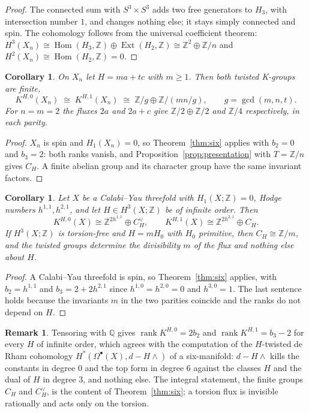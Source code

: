 \documentclass[reqno,11pt]{amsart}
\newtheorem{corollary}[theorem]{Corollary}
\theoremstyle{definition}
\newtheorem{remark}[theorem]{Remark}
\newcommand{\ZZ}{\mathbb{Z}}
\newcommand{\QQ}{\mathbb{Q}}
\newcommand{\rk}{\operatorname{rank}}
\DeclareMathOperator{\Hom}{Hom}
\DeclareMathOperator{\Ext}{Ext}
\begin{document}
\begin{proof}
The connected sum with $S^3\times S^3$ adds two free generators to $H_3$, with intersection number $1$, and changes nothing else; it stays simply connected and spin. The cohomology follows from the universal coefficient theorem: $H^3(X_n)\cong\Hom(H_3,\ZZ)\oplus\Ext(H_2,\ZZ)\cong\ZZ^2\oplus\ZZ/n$ and $H^2(X_n)\cong\Hom(H_2,\ZZ)=0$.
\end{proof}

\begin{corollary}\label{cor:realized}
On $X_n$ let $H=ma+tc$ with $m\ge1$. Then both twisted K-groups are finite,
\[
K^{H,0}(X_n)\;\cong\;K^{H,1}(X_n)\;\cong\;\ZZ/g\oplus\ZZ/(mn/g),\qquad g=\gcd(m,n,t).
\]
For $n=m=2$ the fluxes $2a$ and $2a+c$ give $\ZZ/2\oplus\ZZ/2$ and $\ZZ/4$ respectively, in each parity.
\end{corollary}

\begin{proof}
$X_n$ is spin and $H_1(X_n)=0$, so Theorem~\ref{thm:six} applies with $b_2=0$ and $b_3=2$: both ranks vanish, and Proposition~\ref{prop:presentation} with $T=\ZZ/n$ gives $C_H$. A finite abelian group and its character group have the same invariant factors.
\end{proof}

\begin{corollary}\label{cor:cy}
Let $X$ be a Calabi--Yau threefold with $H_1(X;\ZZ)=0$, Hodge numbers $h^{1,1},h^{2,1}$, and let $H\in H^3(X;\ZZ)$ be of infinite order. Then
\[
K^{H,0}(X)\cong\ZZ^{2h^{1,1}}\oplus C_H^\vee,\qquad K^{H,1}(X)\cong\ZZ^{2h^{2,1}}\oplus C_H .
\]
If $H^3(X;\ZZ)$ is torsion-free and $H=mH_0$ with $H_0$ primitive, then $C_H\cong\ZZ/m$, and the twisted groups determine the divisibility $m$ of the flux and nothing else about $H$.
\end{corollary}

\begin{proof}
A Calabi--Yau threefold is spin, so Theorem~\ref{thm:six} applies, with $b_2=h^{1,1}$ and $b_3=2+2h^{2,1}$ since $h^{1,0}=h^{2,0}=0$ and $h^{3,0}=1$. The last sentence holds because the invariants $m$ in the two parities coincide and the ranks do not depend on $H$.
\end{proof}

\begin{remark}\label{rem:rational}
Tensoring with $\QQ$ gives $\rk K^{H,0}=2b_2$ and $\rk K^{H,1}=b_3-2$ for every $H$ of infinite order, which agrees with the computation of the $H$-twisted de Rham cohomology $H^*(\Omega^\bullet(X),d-H\wedge)$ of a six-manifold: $d-H\wedge$ kills the constants in degree $0$ and the top form in degree $6$ against the classes $H$ and the dual of $H$ in degree $3$, and nothing else. The integral statement, the finite groups $C_H$ and $C_H^\vee$, is the content of Theorem~\ref{thm:six}; a torsion flux is invisible rationally and acts only on the torsion.
\end{remark}
\end{document}
